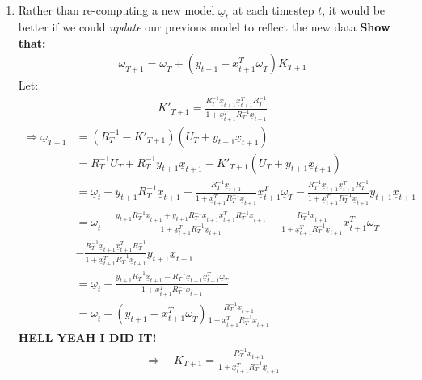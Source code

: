 \documentclass[11pt,letterpaper]{article}
\begin{document}
\begin{enumerate}
\begin{enumerate}
    \item 
    Rather than re-computing a new model $\underline \omega_t$ at each timestep $t$, it would be better if we could \textit{update} our previous model to reflect the new data \textbf{Show that:}
    \begin{align*}
        \underline \omega_{T+1} = \underline \omega_{T} + (y_{t+1} - \underline x_{t+1}^T \underline \omega_T)K_{T+1}
    \end{align*}
    Let:
    \begin{align*}
        K'_{T+1} = \frac{R_{T}^{-1} \underline x_{t+1} \underline x_{t+1}^T R_{T}^{-1} }
         {1 +  \underline x_{t+1}^T R_{T}^{-1} \underline x_{t+1}}
    \end{align*}
    \begin{align*}
        \Rightarrow \underline \omega_{T+1} &= (R_T^{-1} - K'_{T+1})(U_T + y_{t+1}\underline x_{t+1})\\
        &= R_T^{-1}U_T + R_T^{-1}y_{t+1}\underline x_{t+1} - K'_{T+1}(U_T + y_{t+1}\underline x_{t+1})\\
        &= \underline \omega_t + y_{t+1}R_T^{-1}\underline x_{t+1} - 
        \frac{R_{T}^{-1} \underline x_{t+1} }
         {1 +  \underline x_{t+1}^T R_{T}^{-1} \underline x_{t+1}}
         \underline x_{t+1}^T \underline \omega_T -
         \frac{R_{T}^{-1} \underline x_{t+1} \underline x_{t+1}^T R_{T}^{-1} }
         {1 +  \underline x_{t+1}^T R_{T}^{-1} \underline x_{t+1}} y_{t+1}\underline x_{t+1}\\
         &= 
        \underline \omega_t 
        + 
        \frac{y_{t+1}R_T^{-1}\underline x_{t+1} + y_{t+1}R_T^{-1}\underline x_{t+1}\underline x_{t+1}^T R_{T}^{-1}\underline x_{t+1}}
        {1 +  \underline x_{t+1}^T R_{T}^{-1}\underline x_{t+1}}
        - 
        \frac{R_{T}^{-1} \underline x_{t+1} }
         {1 +  \underline x_{t+1}^T R_{T}^{-1} \underline x_{t+1}}
         \underline x_{t+1}^T \underline \omega_T \\
         &-
         \frac{R_{T}^{-1} \underline x_{t+1} \underline x_{t+1}^T R_{T}^{-1} }
         {1 +  \underline x_{t+1}^T R_{T}^{-1} \underline x_{t+1}} y_{t+1}\underline x_{t+1}\\
         &= \underline \omega_t + \frac{y_{t+1}R_T^{-1}\underline x_{t+1} - R_{T}^{-1} \underline x_{t+1}\underline x_{t+1}^T \underline \omega_T}{1 +  \underline x_{t+1}^T R_{T}^{-1} \underline x_{t+1}}\\
         &= \underline \omega_t + (y_{t+1}-x_{t+1}^T \underline \omega_T)\frac{R_{T}^{-1} \underline x_{t+1}}{1 +  \underline x_{t+1}^T R_{T}^{-1} \underline x_{t+1}}
    \end{align*}
    \textbf{HELL YEAH I DID IT!}
    \begin{align*}
        \Rightarrow \quad K_{T+1}=\frac{R_{T}^{-1} \underline x_{t+1}}{1 +  \underline x_{t+1}^T R_{T}^{-1} \underline x_{t+1}}
    \end{align*}





\end{enumerate}
\end{enumerate}
\end{document}
